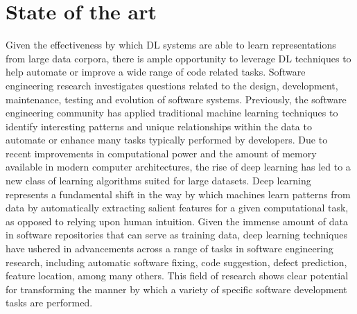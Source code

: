 \section{State of the art}
Given the effectiveness by which DL systems are able to learn representations from large data corpora, there is 
ample opportunity to leverage DL techniques to help automate or improve a wide range of code related tasks. 
Software engineering research investigates questions related to the design, development, maintenance, testing and evolution 
of software systems. Previously, the software engineering community has applied traditional machine learning 
techniques to identify interesting patterns and unique relationships within the data to automate or enhance many tasks typically 
performed by developers. Due to recent improvements in computational power and the amount of memory available 
in modern computer architectures, the rise of deep learning has led to a new class of learning algorithms suited for large datasets.
Deep learning represents a fundamental shift in the way by which machines learn patterns from data by automatically extracting salient features
for a given computational task, as opposed to relying upon human intuition. Given the immense amount of data in software repositories that 
can serve as training data, deep learning techniques have ushered in advancements across a range of tasks in software engineering research, including
automatic software fixing, code suggestion, defect prediction, feature location, among many others. This field of research shows clear potential for
transforming the manner by which a variety of specific software development tasks are performed.

